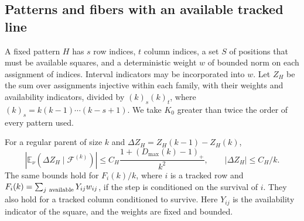 \subsection{Patterns and fibers with an available tracked line}
A fixed pattern $H$ has $s$ row indices, $t$ column indices, a set $S$ of positions that must be available
squares, and a deterministic weight $w$ of bounded norm on each assignment of indices. Interval indicators
may be incorporated into $w$. Let $Z_H$ be the sum over assignments injective within each family, with
their weights and availability indicators, divided by $(k)_s(k)_t$, where $(k)_s=k(k-1)\cdots(k-s+1)$. We
take $K_0$ greater than twice the order of every pattern used.
\begin{lema}\label{lema:incrementos-meso}
For a regular parent of size $k$ and $\Delta Z_H=Z_H(k-1)-Z_H(k)$,
\[
 |\mathbb E_\nu(\Delta Z_H\mid\mathcal F^{(k)})|
 \le C_H\frac{1+(D_{\max}(k)-1)_+}{k^2},\qquad
 |\Delta Z_H|\le C_H/k .
\]
The same bounds hold for $F_i(k)/k$, where $i$ is a tracked row and $F_i(k)=\sum_{j\ {\rm
available}}Y_{ij}w_{ij}$, if the step is conditioned on the survival of $i$. They also hold for a tracked
column conditioned to survive. Here $Y_{ij}$ is the availability indicator of the square, and the weights
are fixed and bounded.
\end{lema}
